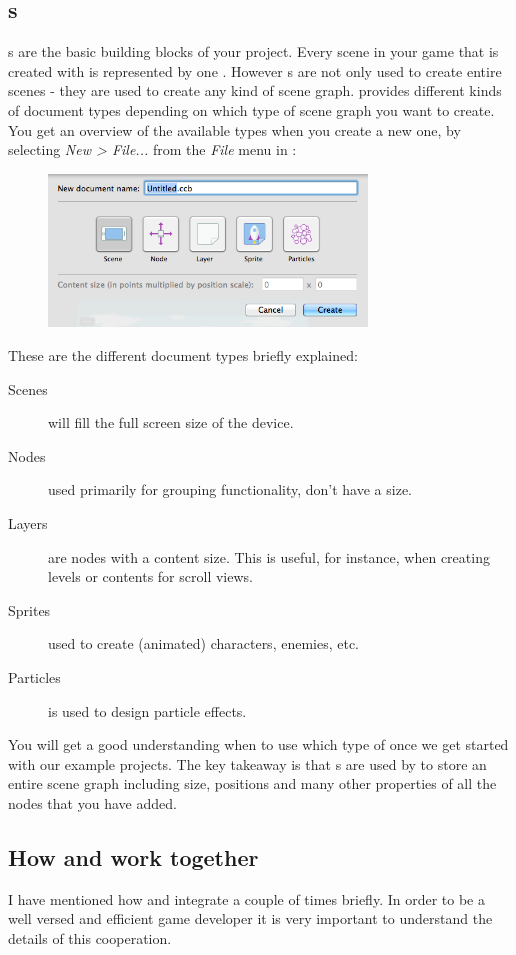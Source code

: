 \subsection{\ccbfile{}s}
\ccbfile{}s are the basic building blocks of your \SB{} project. Every scene in
your game that is created with \SB{} is represented by one \ccbfile{}. However
\ccbfile{}s are not only used to create entire scenes - they are used to create
any kind of scene graph. \SB{} provides different kinds of document types
depending on which type of scene graph you want to create. You get an overview of the
available \ccbfile{} types when you create a new one, by selecting
\textit{New > File... } from the \textit{File} menu in \SB{}:
\label{DocumentTypes}
\begin{figure}[H]
		\centering
		\includegraphics[width=240pt]{images/spritebuilder/new-ccb.png}     
\end{figure} 
These are the different document types briefly explained:
\begin{description}
\item[Scenes] will fill the full screen size of the device.
\item[Nodes] used primarily for grouping functionality, don't have a size.
\item[Layers] are nodes with a content size. This is useful, for instance, when
creating levels or contents for scroll views.
\item[Sprites] used to create (animated) characters, enemies, etc.
\item[Particles] is used to design particle effects.
\end{description}
You will get a good understanding when to use which type of \ccbfile{} once we
get started with our example projects. The key takeaway is that \ccbfile{}s are
used by \SB{} to store an entire scene graph including size, positions and many
other properties of all the nodes that you have added.

\subsection{How \SB{} and \xcode{} work together}
\label{Publish}
I have mentioned how \SB{} and \xcode{} integrate a couple of times briefly. In
order to be a well versed and efficient \SB{} game developer it is very
important to understand the details of this cooperation.

